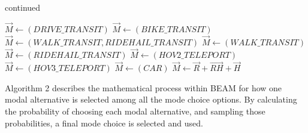 \documentclass[simple, masters, twoside]{byuthesis}
\begin{document}
\addtocounter{algorithm}{-1}
\begin{algorithm}
\caption{continued}
\begin{algorithmic} [1]
      \State $\vec{M} \gets (DRIVE\_TRANSIT)$
    \Else
      \State $\vec{M} \gets (BIKE\_TRANSIT)$
    \EndIf  
  \Else
    \State $\vec{M} \gets (WALK\_TRANSIT, RIDEHAIL\_TRANSIT)$
  \EndIf
{}  
    \State $\vec{M} \gets (WALK\_TRANSIT)$
  \Else
    \State $\vec{M} \gets (RIDEHAIL\_TRANSIT)$
  \EndIf
{}  
    \State $\vec{M} \gets (HOV2\_TELEPORT)$
  \Else
    \State $\vec{M} \gets (HOV3\_TELEPORT)$
  \EndIf
{}
  \State $\vec{M} \gets (CAR)$
\Else
  \State $\vec{M} \gets \vec{R} + \vec{RH} + \vec{H}$  
\EndIf  
\EndProcedure
\EndFor
\EndFor
\Statex
\end{algorithmic}
\end{algorithm}

Algorithm 2 describes the mathematical process within BEAM for how one modal alternative is selected among all the mode choice options. By calculating the probability of choosing each modal alternative, and sampling those probabilities, a final mode choice is selected and used.
\end{document}
